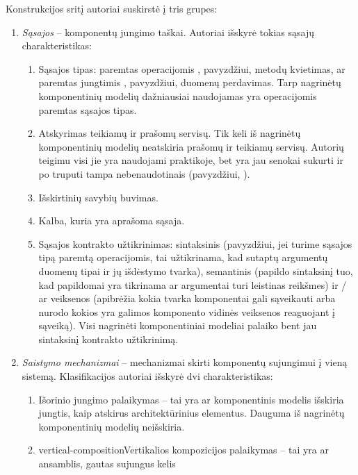 Konstrukcijos sritį autoriai suskirstė į tris grupes:
\begin{enumerate}
  \item \emph{Sąsajos}  – komponentų jungimo taškai.
    Autoriai išskyrė tokias sąsajų charakteristikas:
    \begin{enumerate}
      \item Sąsajos tipas: paremtas operacijomis ,
        pavyzdžiui, metodų kvietimas, ar paremtas jungtimis
        , pavyzdžiui, duomenų perdavimas. Tarp nagrinėtų
        komponentinių modelių dažniausiai naudojamas yra operacijomis
        paremtas sąsajos tipas.
      \item Atskyrimas teikiamų ir prašomų servisų. Tik keli iš
        nagrinėtų komponentinių modelių neatskiria prašomų ir
        teikiamų servisų. Autorių teigimu visi jie yra naudojami
        praktikoje, bet yra jau senokai sukurti ir po truputi tampa
        nebenaudotinais (pavyzdžiui, ).
      \item Išskirtinių savybių buvimas.
      \item Kalba, kuria yra aprašoma sąsaja.
      \item Sąsajos kontrakto užtikrinimas: sintaksinis (pavyzdžiui,
        jei turime sąsajos tipą paremtą operacijomis, tai
        užtikrinama, kad sutaptų argumentų duomenų tipai ir jų
        išdėstymo tvarka), semantinis (papildo sintaksinį tuo, kad
        papildomai yra tikrinama ar argumentai turi leistinas reikšmes)
        ir / ar veiksenos (apibrėžia kokia tvarka komponentai gali
        sąveikauti arba nurodo kokios yra galimos komponento vidinės
        veiksenos reaguojant į sąveiką). Visi nagrinėti
        komponentiniai modeliai palaiko bent jau sintaksinį kontrakto
        užtikrinimą.
    \end{enumerate}
  \item \emph{Saistymo mechanizmai}  – mechanizmai
    skirti komponentų sujungimui į vieną sistemą. Klasifikacijos
    autoriai išskyrė dvi charakteristikas:
    \begin{enumerate}
      \item Išorinio jungimo palaikymas – tai yra ar komponentinis modelis
        išskiria jungtis, kaip atskirus architektūrinius elementus.
        Dauguma iš nagrinėtų komponentinių modelių neišskiria.
      \item \gls{vertical-composition}{Vertikalios kompozicijos}
        palaikymas – tai yra ar ansamblis, gautas sujungus kelis

\end{enumerate}
\end{enumerate}
